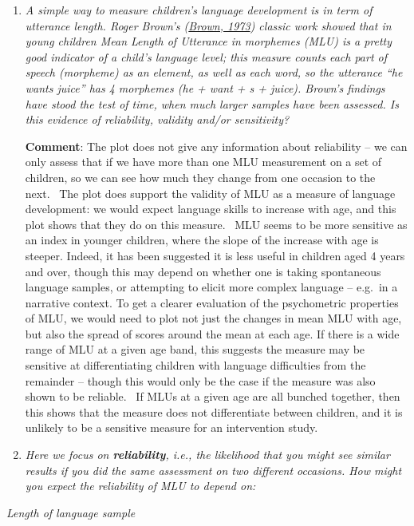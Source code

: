\documentclass{krantz}
\begin{document}
\begin{enumerate}
\def\labelenumi{\arabic{enumi}.}
\item
  \emph{A simple way to measure children's language development is in term of utterance length. Roger Brown's (\protect\hyperlink{ref-brown1973}{Brown, 1973}) classic work showed that in young children Mean Length of Utterance in morphemes (MLU) is a pretty good indicator of a child's language level; this measure counts each part of speech (morpheme) as an element, as well as each word, so the utterance ``he wants juice'' has 4 morphemes (he + want + s + juice). Brown's findings have stood the test of time, when much larger samples have been assessed. Is this evidence of reliability, validity and/or sensitivity?}

  \textbf{Comment}: The plot does not give any information about reliability -- we can only assess that if we have more than one MLU measurement on a set of children, so we can see how much they change from one occasion to the next.~ The plot does support the validity of MLU as a measure of language development: we would expect language skills to increase with age, and this plot shows that they do on this measure.~ MLU seems to be more sensitive as an index in younger children, where the slope of the increase with age is steeper. Indeed, it has been suggested it is less useful in children aged 4 years and over, though this may depend on whether one is taking spontaneous language samples, or attempting to elicit more complex language -- e.g.~in a narrative context. To get a clearer evaluation of the psychometric properties of MLU, we would need to plot not just the changes in mean MLU with age, but also the spread of scores around the mean at each age. If there is a wide range of MLU at a given age band, this suggests the measure may be sensitive at differentiating children with language difficulties from the remainder -- though this would only be the case if the measure was also shown to be reliable. ~If MLUs at a given age are all bunched together, then this shows that the measure does not differentiate between children, and it is unlikely to be a sensitive measure for an intervention study.
\item
  \emph{Here we focus on \textbf{reliability}, i.e., the likelihood that you might see similar results if you did the same assessment on two different occasions. How might you expect the reliability of MLU to depend on:}
\end{enumerate}

\emph{Length of language sample}
\end{document}
